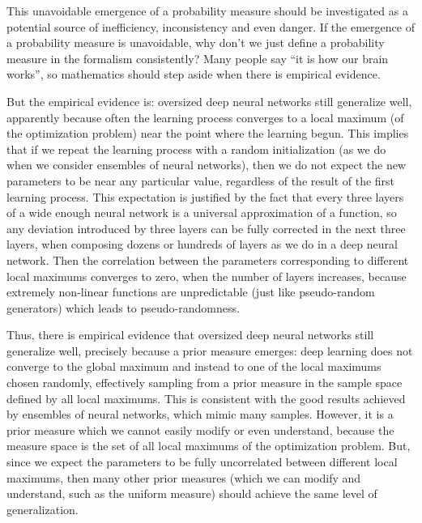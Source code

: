 \documentclass[11pt]{book}
\begin{document}
This unavoidable emergence of a probability measure should be
investigated as a potential source of inefficiency, inconsistency and
even danger. If the emergence of a probability measure is unavoidable,
why don't we just define a probability measure in the formalism
consistently? Many people say ``it is how our brain works'', so
mathematics should step aside when there is empirical evidence.

But the empirical evidence is: oversized deep neural networks still
generalize well, apparently because often the learning process converges
to a local maximum (of the optimization problem) near the point where
the learning begun\cite{li_learning_2018}. This implies that if we repeat the learning process with a
random initialization (as we do when we consider ensembles of neural
networks\cite{lakshminarayanan_simple_2017}\cite{egele_autodeuq_2022}), then we do not expect the new parameters to be near any
particular value, regardless of the result of the first learning
process. This expectation is justified by the fact that every three
layers of a wide enough neural network is a universal approximation of a
function\cite{hornik_multilayer_1989}, so any deviation introduced by three
layers can be fully corrected in the next three layers, when composing
dozens or hundreds of layers as we do in a deep neural network. Then the
correlation between the parameters corresponding to different local
maximums converges to zero, when the number of layers increases, because
extremely non-linear functions are unpredictable (just like
pseudo-random generators) which leads to pseudo-randomness.

Thus, there is empirical evidence that oversized deep neural networks
still generalize well, precisely because a prior measure emerges: deep
learning does not converge to the global maximum and instead to one of
the local maximums chosen randomly, effectively sampling from a prior
measure in the sample space defined by all local maximums. This is
consistent with the good results achieved by ensembles of neural
networks\cite{lakshminarayanan_simple_2017}\cite{egele_autodeuq_2022}, which mimic many samples. However, it is a prior measure which
we cannot easily modify or even understand, because the measure space is
the set of all local maximums of the optimization problem. But, since we
expect the parameters to be fully uncorrelated between different local
maximums, then many other prior measures (which we can modify and
understand, such as the uniform measure) should achieve the same level
of generalization.
\end{document}

